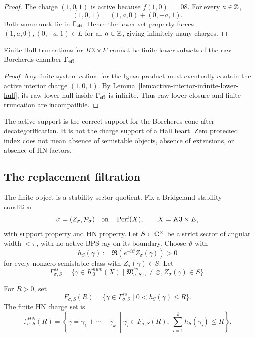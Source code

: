 \begin{proof}
The charge \((1,0,1)\) is active because \(f(1,0)=108\).  For every
\(a\in\mathbb Z\),
\[
  (1,0,1)=(1,a,0)+(0,-a,1).
\]
Both summands lie in \(\Gamma_{\mathrm{eff}}\).  Hence the lower-set property forces
\((1,a,0),(0,-a,1)\in L\) for all \(a\in\mathbb Z\), giving infinitely many
charges.
\end{proof}

\begin{proposition}
\label{prop:raw-lower-sets-not-finite-hall}
Finite Hall truncations for \(K3\times E\) cannot be finite lower
subsets of the raw Borcherds chamber \(\Gamma_{\mathrm{eff}}\).
\end{proposition}

\begin{proof}
Any finite system cofinal for the Igusa product must eventually contain
the active interior charge \((1,0,1)\).  By
Lemma~\ref{lem:active-interior-infinite-lower-hull}, its raw lower hull
inside \(\Gamma_{\mathrm{eff}}\) is infinite.  Thus raw lower closure and finite
truncation are incompatible.
\end{proof}

\begin{remark}
The active support is the correct support for the Borcherds cone after
decategorification.  It is not the charge support of a Hall heart.  Zero
protected index does not mean absence of semistable objects, absence of
extensions, or absence of HN factors.
\end{remark}

\subsection{The replacement filtration}

The finite object is a stability-sector quotient.  Fix a Bridgeland
stability condition
\[
  \sigma=(Z_\sigma,\mathcal P_\sigma)
  \quad\hbox{on}\quad \operatorname{Perf}(X),
  \qquad X=K3\times E,
\]
with support property and HN property.  Let \(S\subset\mathbb C^\times\) be a
strict sector of angular width \(<\pi\), with no active BPS ray on its
boundary.  Choose \(\vartheta\) with
\[
  h_S(\gamma):=\Re(e^{-i\vartheta}Z_\sigma(\gamma))>0
\]
for every nonzero semistable class with \(Z_\sigma(\gamma)\in S\).
Let
\[
  \Gamma_{\sigma,S}^{ss}
  =
  \{\gamma\in K_0^{num}(X)\mid
  \mathfrak M_{\sigma,S,\gamma}^{ss}\ne\varnothing,
  Z_\sigma(\gamma)\in S\}.
\]

\begin{definition}
\label{def:finite-hn-charge-set}
For \(R>0\), set
\[
  F_{\sigma,S}(R)
  =
  \{\gamma\in\Gamma_{\sigma,S}^{ss}\mid 0<h_S(\gamma)\le R\}.
\]
The finite HN charge set is
\[
  \Gamma_{\sigma,S}^{HN}(R)
  =
  \left\{
  \gamma=\gamma_1+\cdots+\gamma_k\ \middle|
  \gamma_i\in F_{\sigma,S}(R),\
  \sum_{i=1}^k h_S(\gamma_i)\le R
  \right\}.
\]
\end{definition}

